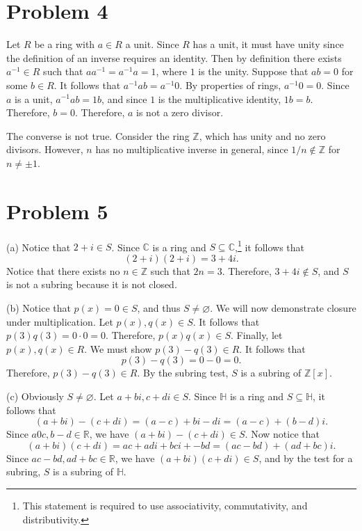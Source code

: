 \documentclass[11pt, letterpaper]{report}
\begin{document}
\section*{Problem 4}
Let $R$ be a ring with $a\in R$ a unit. Since $R$ has a unit, it must have unity since the definition of an inverse requires an identity. Then by definition there exists $a^{-1}\in R$ such that $aa^{-1}=a^{-1}a=1$, where $1$ is the unity. Suppose that $ab=0$ for some $b\in R$. It follows that $a^{-1}ab=a^{-1}0$. By properties of rings,  $a^{-1}0=0$. Since $a$ is a unit, $a^{-1}ab=1b$, and since $1$ is the multiplicative identity, $1b=b$. Therefore, $b=0$. Therefore, $a$ is not a zero divisor.

The converse is not true. Consider the ring $\mathbb{Z}$, which has unity and no zero divisors. However, $n$ has no multiplicative inverse in general, since $1 /n\notin \mathbb{Z}$ for $n\neq \pm1$.
\section*{Problem 5}
(a) Notice that $2+i\in S$. Since $\mathbb{C}$ is a ring and $S\subseteq \mathbb{C}$,\footnote{This statement is required to use associativity, commutativity, and distributivity.} it follows that
\[
	\left( 2+i \right) \left( 2+i \right) =3+4i
.\]
Notice that there exists no $n\in\mathbb{Z}$ such that $2n=3$. Therefore, $3+4i\notin S$, and $S$ is not a subring because it is not closed.

\noindent(b) Notice that $p(x)=0\in S$, and thus $S\neq \varnothing$. We will now demonstrate closure under multiplication. Let $p(x),q(x)\in S$. It follows that $p(3)q(3)=0\cdot 0=0$. Therefore, $p(x)q(x)\in S$. Finally, let $p(x),q(x)\in R$. We must show $p(3)-q(3)\in R$. It follows that
\[
	p(3)-q(3)=0-0=0
.\]
Therefore, $p(3)-q(3)\in R$. By the subring test, $S$ is a subring of $\mathbb{Z}[x]$.

\noindent(c) Obviously $S\neq \varnothing$. Let $a+bi,c+di\in S$. Since $\mathbb{H}$ is a ring and $S\subseteq \mathbb{H}$, it follows that
 \[
	 \left( a+bi \right) -\left( c+di \right) =\left( a-c \right) +bi-di=\left( a-c \right) +\left( b-d \right) i
.\]
Since $a0c,b-d\in\mathbb{R}$, we have $\left( a+bi \right) -\left( c+di \right) \in S$.  Now notice that
\[
	\left( a+bi \right) \left( c+di \right) =ac+adi+bci+-bd=\left( ac-bd \right) +\left( ad+bc \right) i
.\]
Since $ac-bd,ad+bc\in\mathbb{R}$, we have $\left( a+bi \right) \left( c+di \right) \in S$, and by the test for a subring, $S$ is a subring of $\mathbb{H}$.
\end{document}
